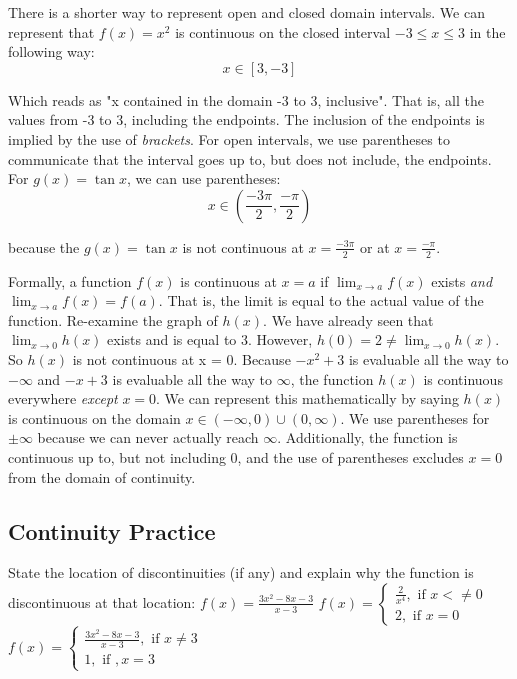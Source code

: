 There is a shorter way to represent open and closed domain intervals. We can 
represent that $f(x) = x^2$ is continuous on the closed interval $-3 \leq x \leq 3$ 
in the following way: $$x \in \left[3, -3 \right]$$

Which reads as "x contained in the domain -3 to 3, inclusive". That is, all the 
values from -3 to 3, including the endpoints. The inclusion of the endpoints is 
implied by the use of \textit{brackets}. For open intervals, we use parentheses to 
communicate that the interval goes up to, but does not include, the endpoints. For 
$g(x) = \tan{x}$, we can use parentheses: $$x \in \left(\frac{-3\pi}{2}, \frac{-\pi}{2}\right)$$

because the $g(x) = \tan{x}$ is not continuous at $x=\frac{-3\pi}{2}$ or at 
$x=\frac{-\pi}{2}$.



Formally, a function $f(x)$ is continuous at $x=a$ if $\lim_{x\to a}f(x)$ exists 
\textit{and} $\lim_{x\to a}f(x) = f(a)$. That is, the limit is equal to the actual 
value of the function. Re-examine the graph of $h(x)$. We have already seen that $
\lim_{x\to 0}h(x)$ exists and is equal to 3. However, $h(0) = 2 \neq \lim_{x\to0}
h(x)$. So $h(x)$ is not continuous at x = 0. Because $-x^2+3$ is evaluable all the 
way to $-\infty$ and $-x+3$ is evaluable all the way to $\infty$, the function 
$h(x)$ is continuous everywhere \textit{except} $x=0$. We can represent this 
mathematically by saying $h(x)$ is continuous on the domain $x \in \left(-\infty, 
0\right)\cup \left(0, \infty\right)$. We use parentheses for $\pm\infty$ because we 
can never actually reach $\infty$. Additionally, the function is continuous up to, 
but not including $0$, and the use of parentheses excludes $x=0$ from the domain of 
continuity.

\subsection{Continuity Practice}
\begin{Exercise}[title=Limits Practice 5, label=limits5]
State the location of discontinuities (if any) and explain why the function is 
discontinuous at that location:
    \Question $f(x) = \frac{3x^2-8x-3}{x-3}$
    \Question $f(x) = \begin{cases}
    \frac{2}{x^4}, \text{ if } x <\neq 0\\
    2, \text{ if } x=0
    \end{cases}$
    \Question $f(x) = \begin{cases}
        \frac{3x^2-8x-3}{x-3}, \text{ if } x \neq 3\\
        1, \text{ if }, x=3
    \end{cases}$
\end{Exercise}

